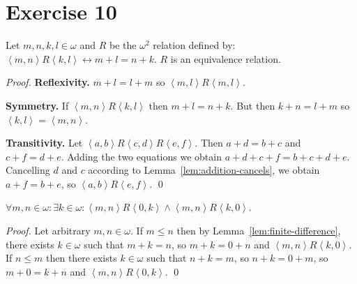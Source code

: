 \documentclass[11pt]{llncs}
\begin{document}
\section*{Exercise 10}
\begin{lemma}
  Let $m, n, k, l \in \omega$ and $R$ be the $\omega^2$ relation defined by:
  $\left<m, n\right>R\left<k, l\right> \leftrightarrow m + l = n + k$.
  $R$ is an equivalence relation.
\end{lemma}
\begin{proof}
  \item
  \noindent
  \textbf{Reflexivity.} $m + l = l + m$ so $\left<m, l\right>R\left<m, l\right>$.

  \noindent
  \textbf{Symmetry.} If $\left<m, n\right>R\left<k, l\right>$ then
  $m + l = n + k$. But then $k + n = l + m$ so
  $\left<k, l\right> = \left<m, n\right>$.

  \noindent
  \textbf{Transitivity.}
  Let $\left<a, b\right> R \left<c, d\right> R \left<e, f\right>$.
  Then $a + d = b + c$ and $c + f = d + e$.
  Adding the two equations we obtain
  $a + d + c + f = b + c + d + e$.
  Cancelling $d$ and $c$ according to Lemma~\ref{lem:addition-cancels}, we
  obtain $a + f = b + e$, so
  $\left<a, b\right> R \left<e, f\right>$.
  \qed
\end{proof}

\begin{lemma}
  $\forall m, n \in \omega: \exists k \in \omega:
   \left<m, n\right> R \left<0, k\right> \land
   \left<m, n\right> R \left<k, 0\right>$.
\end{lemma}
\begin{proof}
  Let arbitrary $m, n \in \omega$. If $m \leq n$ then by
  Lemma~\ref{lem:finite-difference}, there exists $k \in \omega$ such that
  $m + k = n$, so $m + k = 0 + n$ and $\left<m, n\right> R \left<k, 0\right>$.
  If $n \leq m$ then there exists $k \in \omega$ such that $n + k = m$, so
  $n + k = 0 + m$, so $m + 0 = k + n$ and
  $\left<m, n\right> R \left<0, k\right>$.
  \qed
\end{proof}
\end{document}
